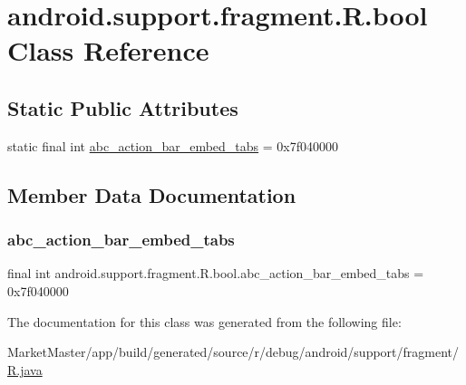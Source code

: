 \hypertarget{classandroid_1_1support_1_1fragment_1_1R_1_1bool}{}\section{android.\+support.\+fragment.\+R.\+bool Class Reference}
\label{classandroid_1_1support_1_1fragment_1_1R_1_1bool}
\subsection*{Static Public Attributes}
\begin{DoxyCompactItemize}
\item 
static final int \mbox{\hyperlink{classandroid_1_1support_1_1fragment_1_1R_1_1bool_aade12b7432258093b82bae701731c7f7}{abc\+\_\+action\+\_\+bar\+\_\+embed\+\_\+tabs}} = 0x7f040000
\end{DoxyCompactItemize}


\subsection{Member Data Documentation}
\mbox{\label{classandroid_1_1support_1_1fragment_1_1R_1_1bool_aade12b7432258093b82bae701731c7f7}} 
\subsubsection{\texorpdfstring{abc\+\_\+action\+\_\+bar\+\_\+embed\+\_\+tabs}{abc\_action\_bar\_embed\_tabs}}
{\footnotesize\ttfamily final int android.\+support.\+fragment.\+R.\+bool.\+abc\+\_\+action\+\_\+bar\+\_\+embed\+\_\+tabs = 0x7f040000\hspace{0.3cm}{\ttfamily [static]}}



The documentation for this class was generated from the following file\+:\begin{DoxyCompactItemize}
\item 
Market\+Master/app/build/generated/source/r/debug/android/support/fragment/\mbox{\hyperlink{debug_2android_2support_2fragment_2R_8java}{R.\+java}}\end{DoxyCompactItemize}
